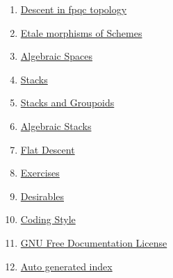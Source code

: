 \begin{multicols}{2}
\begin{enumerate}
\item \hyperref[fpqc-descent-section-introduction]{Descent in fpqc topology}
\item \hyperref[etale-section-introduction]{Etale morphisms of Schemes}
\item \hyperref[spaces-section-introduction]{Algebraic Spaces}
\item \hyperref[stacks-section-introduction]{Stacks}
\item \hyperref[stacks-groupoids-section-introduction]{Stacks and Groupoids}
\item \hyperref[algebraic-section-introduction]{Algebraic Stacks}
\item \hyperref[flat-section-introduction]{Flat Descent}
\item \hyperref[exercises-section-algebra]{Exercises}
\item \hyperref[desirables-section-introduction]{Desirables}
\item \hyperref[coding-section-style]{Coding Style}
\item \hyperref[fdl-version]{GNU Free Documentation License}
\item \hyperref[index-section-begin]{Auto generated index}
\end{enumerate}
\end{multicols}
